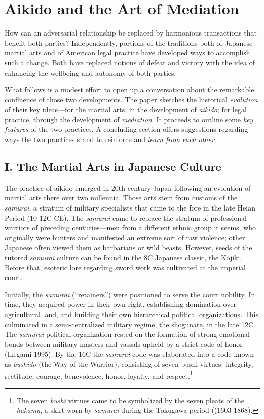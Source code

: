 \chapter[Aikido and the Art of Mediation (2013)]{Aikido and the Art of Mediation}

How can an adversarial relationship be replaced by harmonious transactions that benefit both parties? Independently, portions of the traditions both of Japanese martial arts and of American legal practice have developed ways to accomplish such a change. Both have replaced notions of defeat and victory with the idea of enhancing the wellbeing and autonomy of both parties. 

What follows is a modest effort to open up a conversation about the remarkable confluence of those two developments. The paper sketches the historical \emph{evolution} of their key ideas---for the martial arts, in the development of \emph{aikido}; for legal practice, through the development of \emph{mediation}. It proceeds to outline some \emph{key features} of the two practices. A concluding section offers suggestions regarding ways the two practices stand to reinforce and \emph{learn from each other}.

\section*{I. The Martial Arts in Japanese Culture}

The practice of aikido emerged in 20th-century Japan following an evolution of martial arts there over two millennia. Those arts stem from customs of the \emph{samurai}, a stratum of military specialists that came to the fore in the late Heian Period (10-12C CE). The \emph{samurai} came to replace the stratum of professional warriors of preceding centuries---men from a different ethnic group it seems, who originally were hunters and manifested an extreme sort of raw violence; other Japanese often viewed them as barbarians or wild beasts. However, seeds of the tutored \emph{samurai} culture can be found in the 8C Japanese classic, the Kojiki. Before that, esoteric lore regarding sword work was cultivated at the imperial court.

Initially, the \emph{samurai} (``retainers'') were positioned to serve the court nobility. In time, they acquired power in their own right, establishing domination over agricultural land, and building their own hierarchical political organizations. This culminated in a semi-centralized military regime, the shogunate, in the late 12C. The \emph{samurai} political organization rested on the formation of strong emotional bonds between military masters and vassals upheld by a strict code of honor (Ikegami 1995). By the 16C the \emph{samurai} code was elaborated into a code known as \emph{bushido} (the Way of the Warrior), consisting of seven bushi virtues: integrity, rectitude, courage, benevolence, honor, loyalty, and respect.\footnote{The seven \emph{bushi} virtues came to be symbolized by the seven pleats of the \emph{hakama}, a skirt worn by \emph{samurai} during the Tokugawa period ((1603-1868).}

